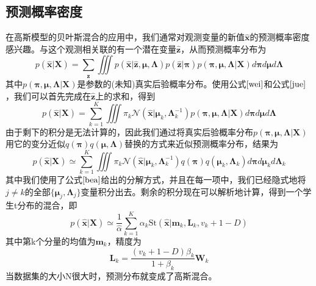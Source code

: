 \subsection*{预测概率密度}
在高斯模型的贝叶斯混合的应用中，我们通常对观测变量的新值$\hat{\boldsymbol{x}}$的预测概率密度感兴趣。与这个观测相关联的有一个潜在变量$\hat{\boldsymbol{z}}$，从而预测概率分布为
\begin{equation}
	p(\hat{\boldsymbol{x}}|\boldsymbol{X})=\sum_{\hat{\boldsymbol{z}}}\iiint p(\hat{\boldsymbol{x}}|\hat{\boldsymbol{z}},\boldsymbol{\mu},\boldsymbol{\Lambda})p(\hat{\boldsymbol{z}}|\boldsymbol{\pi})p(\boldsymbol{\pi},\boldsymbol{\mu},\boldsymbol{\Lambda}|\boldsymbol{X})d\boldsymbol{\pi}d\boldsymbol{\mu}d\boldsymbol{\Lambda}
\end{equation}
其中$p(\boldsymbol{\pi},\boldsymbol{\mu},\boldsymbol{\Lambda}|\boldsymbol{X})$是参数的(未知)真实后验概率分布。使用公式$\ref{wei}$和公式$\ref{jue}$，我们可以首先完成在$\hat{\boldsymbol{z}}$上的求和，得到 
\begin{equation}
	p(\hat{\boldsymbol{x}}|\boldsymbol{X})=\sum_{k=1}^{K}\iiint \pi_k\mathcal{N}(\hat{\boldsymbol{x}}|\boldsymbol{\mu}_k,\boldsymbol{\Lambda}_k^{-1})p(\boldsymbol{\pi},\boldsymbol{\mu},\boldsymbol{\Lambda}|\boldsymbol{X})d\boldsymbol{\pi}d\boldsymbol{\mu}d\boldsymbol{\Lambda}
\end{equation}
由于剩下的积分是无法计算的，因此我们通过将真实后验概率分布$p(\boldsymbol{\pi},\boldsymbol{\mu},\boldsymbol{\Lambda}|\boldsymbol{X})$用它的变分近似$q(\boldsymbol{\pi})q(\boldsymbol{\mu},\boldsymbol{\Lambda})$替换的方式来近似预测概率分布，结果为
\begin{equation}
		p(\hat{\boldsymbol{x}}|\boldsymbol{X})\simeq \sum_{k=1}^{K}\iiint \pi_k\mathcal{N}(\hat{\boldsymbol{x}}|\boldsymbol{\mu}_k,\boldsymbol{\Lambda}_k^{-1})q(\boldsymbol{\pi})q(\boldsymbol{\mu}_k,\boldsymbol{\Lambda}_k)d\boldsymbol{\pi}d\boldsymbol{\mu}_kd\boldsymbol{\Lambda}_k
\end{equation}
其中我们使用了公式$\ref{bea}$给出的分解方式，并且在每一项中，我们已经隐式地将$j\ne k$的全部$\{\boldsymbol{\mu}_j,\boldsymbol{\Lambda}_j \}$变量积分出去。剩余的积分现在可以解析地计算，得到一个学生t分布的混合，即
\begin{equation}
	p(\hat{\boldsymbol{x}}|\boldsymbol{X})\simeq\frac{1}{\hat{\alpha}}\sum_{k=1}^{K}\alpha_k\mathrm{St}(\hat{\boldsymbol{x}}|\boldsymbol{m}_k,\boldsymbol{L}_k,v_k+1-D)
\end{equation}
其中第k个分量的均值为$\boldsymbol{m}_k$，精度为
\begin{equation}
	\boldsymbol{L}_k=\frac{(v_k+1-D)\beta_k}{1+\beta_k}\boldsymbol{W}_k
\end{equation}
当数据集的大小N很大时，预测分布就变成了高斯混合。
